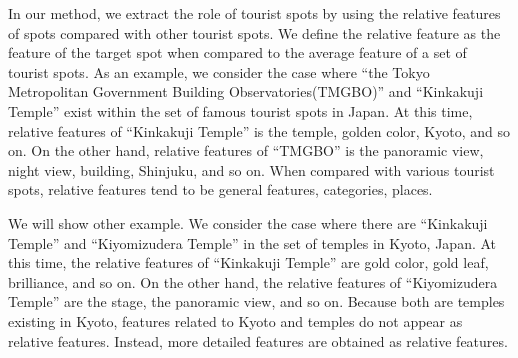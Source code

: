 \documentclass[journal]{IAENGtran}
\begin{document}
In our method, we extract the role of tourist spots by using the relative features of spots compared with other tourist spots.
We define the relative feature as the feature of the target spot when compared to the average feature of a set of tourist spots.
As an example, we consider the case where ``the Tokyo Metropolitan Government Building Observatories(TMGBO)'' and ``Kinkakuji Temple'' exist within the set of famous tourist spots in Japan.
At this time, relative features of ``Kinkakuji Temple'' is the temple, golden color, Kyoto, and so on.
On the other hand, relative features of ``TMGBO'' is the panoramic view, night view, building, Shinjuku, and so on.
When compared with various tourist spots, relative features tend to be general features, categories, places.

We will show other example. We consider the case where there are ``Kinkakuji Temple'' and ``Kiyomizudera Temple'' in the set of temples in Kyoto, Japan.
At this time, the relative features of ``Kinkakuji Temple'' are gold color, gold leaf, brilliance, and so on.
On the other hand, the relative features of ``Kiyomizudera Temple'' are the stage, the panoramic view, and so on.
Because both are temples existing in Kyoto, features related to Kyoto and temples do not appear as relative features. Instead, more detailed features are obtained as relative features.
\end{document}
